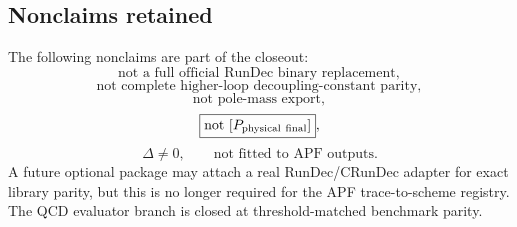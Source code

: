 \subsection{Nonclaims retained}
The following nonclaims are part of the closeout:
\[
\boxed{\text{not a full official RunDec binary replacement}},
\]
\[
\boxed{\text{not complete higher-loop decoupling-constant parity}},
\]
\[
\boxed{\text{not pole-mass export}},
\]
\[
\boxed{\text{not }[P_{\rm physical\ final}]},
\]
\[
\boxed{\Delta\ne0},
\qquad
\boxed{\text{not fitted to APF outputs}}.
\]
A future optional package may attach a real RunDec/CRunDec adapter for exact library parity, but this is no longer required for the APF trace-to-scheme registry.  The QCD evaluator branch is closed at threshold-matched benchmark parity.

